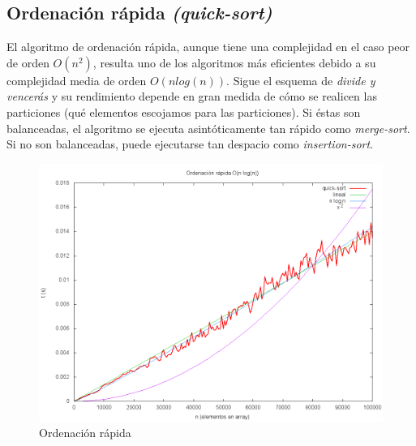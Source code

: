 \subsection{Ordenación rápida \textit{(quick-sort)}}
El algoritmo de ordenación rápida, aunque tiene una complejidad en el caso peor de orden $O(n^2)$, resulta uno de los algoritmos más eficientes debido a su complejidad media de orden $O(nlog(n))$.  Sigue el esquema de \textit{divide y vencerás} y su rendimiento depende en gran medida de cómo se realicen las particiones (qué elementos escojamos para las particiones).  Si éstas son balanceadas, el algoritmo se ejecuta asintóticamente tan rápido como \textit{merge-sort}.  Si no son balanceadas, puede ejecutarse tan despacio como \textit{insertion-sort}.\cite{CORMEN}
	\begin{figure}[H]
  		\centering
   	 	\includegraphics[width=1.0\textwidth]{quick-sort.png}
  		\caption{Ordenación rápida}
  		\label{fig:quick}
	\end{figure}
	
